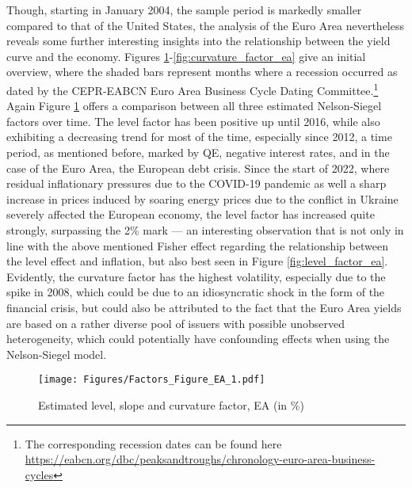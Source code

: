 Though, starting in January 2004, the sample period is markedly smaller compared to that of the United States, the analysis of the Euro Area nevertheless reveals some further interesting insights into the relationship between the yield curve and the economy.
Figures \ref{fig:factors_ea}-\ref{fig:curvature_factor_ea} give an initial overview, where the shaded bars represent months where a recession occurred as dated by the CEPR-EABCN Euro Area Business Cycle Dating Committee.\footnote{The corresponding recession dates can be found here \url{https://eabcn.org/dbc/peaksandtroughs/chronology-euro-area-business-cycles}}
Again Figure \ref{fig:factors_ea} offers a comparison between all three estimated Nelson-Siegel factors over time.
The level factor has been positive up until 2016, while also exhibiting a decreasing trend for most of the time, especially since 2012, a time period, as mentioned before, marked by QE, negative interest rates, and in the case of the Euro Area, the European debt crisis. 
Since the start of 2022, where residual inflationary pressures due to the COVID-19 pandemic as well a sharp increase in prices induced by soaring energy prices due to the conflict in Ukraine severely affected the European economy, the level factor has increased quite strongly, surpassing the 2\% mark --- an interesting observation that is not only in line with the above mentioned Fisher effect regarding the relationship between the level effect and inflation, but also best seen in Figure \ref{fig:level_factor_ea}. 
Evidently, the curvature factor has the highest volatility, especially due to the spike in  2008, which could be due to an idiosyncratic shock in the form of the financial crisis, but could also be attributed to the fact that the Euro Area yields are based on a rather diverse pool of issuers with possible unobserved heterogeneity, which could potentially have confounding effects when using the Nelson-Siegel model.

\begin{figure}[!t]
    \centering
    \texttt{[image: Figures/Factors\_Figure\_EA\_1.pdf]}
    \caption{Estimated level, slope and curvature factor, EA (in \%)}
    \label{fig:factors_ea}
\end{figure}

